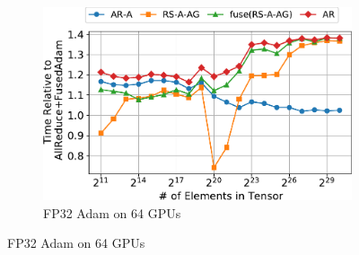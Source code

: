 \begin{figure}
\begin{subfigure}{0.66\columnwidth}
    \includegraphics[width=\columnwidth]{figures/results-adam-64-gpus.pdf}  
    \caption{FP32 Adam on 64 GPUs}
  \end{subfigure}


\end{figure}
